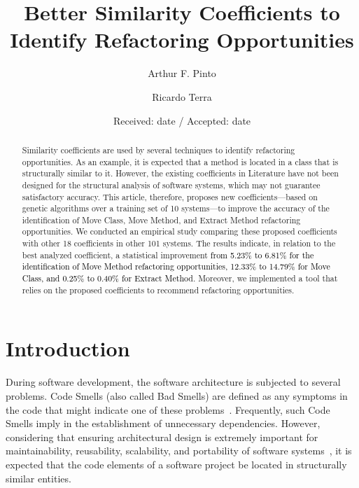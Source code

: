 \documentclass[smallextended,natbib]{svjour3}
\begin{document}
\title{Better Similarity Coefficients to Identify Refactoring Opportunities}

\author{Arthur F. Pinto \and
	Ricardo Terra
}


\date{Received: date / Accepted: date}

\maketitle

\begin{abstract}
Similarity coefficients are used by several techniques to identify refactoring opportunities. As an example, it is expected that a method is located in a class that is structurally similar to it. However, the existing coefficients in Literature have not been designed for the structural analysis of software systems, which may not guarantee satisfactory accuracy. This article, therefore, proposes new coefficients---based on genetic algorithms over a training set of 10 systems---to improve the accuracy of the identification of Move Class, Move Method, and Extract Method refactoring opportunities. We conducted an empirical study comparing these proposed coefficients with other 18 coefficients in other 101 systems. The results indicate, in relation to the best analyzed coefficient, a statistical improvement \textcolor{black}{from 5.23\% to 6.81\% for the identification of Move Method refactoring opportunities, 12.33\% to 14.79\% for Move Class, and 0.25\% to 0.40\% for Extract Method}. Moreover, we implemented a tool that relies on the proposed coefficients to recommend refactoring opportunities.
\end{abstract}

\section{Introduction}
\label{sec:intro}

During software development, the software architecture is subjected to several problems. Code Smells (also called Bad Smells) are defined as any symptoms in the code that might indicate one of these problems~\citep{fowler1999refactoring}. Frequently, such Code Smells imply in the establishment of unnecessary dependencies. However, considering that ensuring architectural design is extremely important for maintainability, reusability, scalability, and portability of software systems~\citep{leoterr}, it is expected that the code elements of a software project be located in structurally similar entities.
\end{document}
